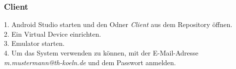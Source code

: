 	  \subsubsection{Client}
	  1. Android Studio starten und den Odner \textit{Client} aus dem Repository öffnen.\\
	  2. Ein Virtual Device einrichten.\\
	  3. Emulator starten.\\
	  4. Um das System verwenden zu können, mit der E-Mail-Adresse \textit{\glqq m.mustermann@th-koeln.de\grqq{}} und dem Passwort \textit{\grqq{}} anmelden.
	
